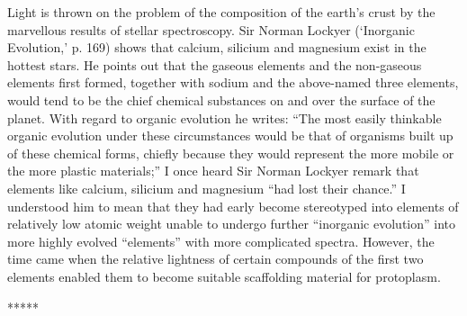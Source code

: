 \documentclass[a4paper, 12pt, oneside]{article}
\begin{document}
Light is thrown on the problem of the composition of the earth's crust by the marvellous results of stellar spectroscopy. Sir Norman Lockyer (`Inorganic Evolution,' p. 169) shows that calcium, silicium and magnesium exist in the hottest stars. He points out that the gaseous elements and the non-gaseous elements first formed, together with sodium and the above-named three elements, would tend to be the chief chemical substances on and over the surface of the planet. With regard to organic evolution he writes: ``The most easily thinkable organic evolution under these circumstances would be that of organisms built up of these chemical forms, chiefly because they would represent the more mobile or the more plastic materials;'' I once heard Sir Norman Lockyer remark that elements like calcium, silicium and magnesium ``had lost their chance.'' I understood him to mean that they had early become stereotyped into elements of relatively low atomic weight unable to undergo further ``inorganic evolution'' into more highly evolved ``elements'' with more complicated spectra. However, the time came when the relative lightness of certain compounds of the first two elements enabled them to become suitable scaffolding material for protoplasm.

\centerline{*\hspace{15mm}*\hspace{15mm}*\hspace{15mm}*\hspace{15mm}*}
\bigskip
\end{document}
